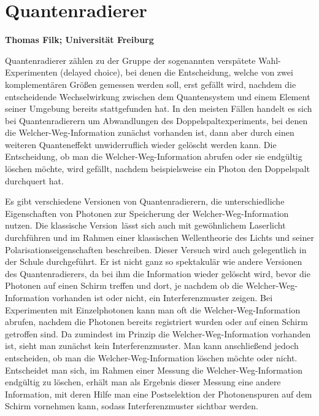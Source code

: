 
\setcounter{page}{1}
\setcounter{section}{0}
\setcounter{figure}{0}
\setcounter{equation}{0}
\setcounter{table}{0}
\setcounter{footnote}{0}

\section*{Quantenradierer}
\noindent
{\bf Thomas Filk; Universit\"at Freiburg}
\vspace{1cm}

\label{chap_Quantenradierer}

\noindent
Quantenradierer z\"ahlen zu der Gruppe der sogenannten \glqq versp\"atete Wahl\grqq-Experimenten
(delayed choice), bei denen die Entscheidung, welche von zwei komplement\"aren Gr\"o\ss en
gemessen werden soll, erst gef\"allt wird, nachdem die entscheidende Wechselwirkung zwischen dem
Quantensystem und einem Element seiner Umgebung bereits stattgefunden hat. In den meisten
F\"allen handelt es sich bei Quantenradierern um Abwandlungen des Doppelspaltexperiments, bei 
denen die \glqq Welcher-Weg\grqq-Information zun\"achst vorhanden ist, dann aber durch
einen weiteren Quanteneffekt unwiderruflich wieder gel\"oscht werden kann. Die Entscheidung,
ob man die \glqq Welcher-Weg\grqq-Information abrufen oder sie endg\"ultig l\"oschen m\"ochte,
wird gef\"allt, nachdem beispielsweise ein Photon  den Doppelspalt durchquert hat. 

Es gibt verschiedene Versionen von Quantenradierern, die unterschiedliche Eigenschaften
von Photonen zur Speicherung der \glqq Welcher-Weg\grqq-Information nutzen. Die
\glqq klassische Version\grqq\ l\"asst sich auch mit gew\"ohnlichem Laserlicht durchf\"uhren und
im Rahmen einer klassischen Wellentheorie des Lichts und seiner Polarisationseigenschaften
beschreiben. Dieser Versuch wird auch gelegentlich in der Schule durchgef\"uhrt. Er ist nicht ganz
so spektakul\"ar wie andere Versionen des Quantenradierers, da bei ihm die Information wieder
gel\"oscht wird, bevor die Photonen auf einen Schirm treffen und dort, je nachdem ob die
\glqq Welcher-Weg\grqq-Information vorhanden ist oder nicht, ein Interferenzmuster zeigen.
Bei Experimenten mit Einzelphotonen kann man oft die \glqq Welcher-Weg\grqq-Information
abrufen, nachdem die Photonen bereits registriert wurden oder auf einen Schirm 
getroffen sind. Da zumindest
im Prinzip die \glqq Welcher-Weg\grqq-Information vorhanden ist, sieht man zun\"achst kein
Interferenzmuster. Man kann anschlie\ss end jedoch entscheiden, ob man die 
\glqq Welcher-Weg\grqq-Information l\"oschen m\"ochte oder nicht. Entscheidet man sich,
im Rahmen einer Messung die \glqq Welcher-Weg\grqq-Information endg\"ultig zu l\"oschen, erh\"alt man 
als Ergebnis dieser Messung eine andere Information, mit deren Hilfe man eine Postselektion 
der Photonenspuren auf dem Schirm vornehmen kann, sodass Interferenzmuster sichtbar werden.

